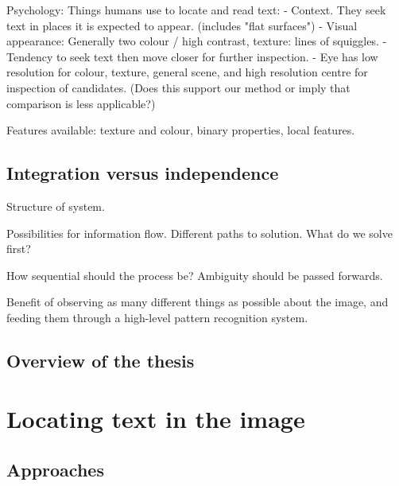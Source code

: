 Psychology:  Things humans use to locate and read text:
	- Context.  They seek text in places it is expected to appear.  (includes "flat surfaces")
	- Visual appearance:  Generally two colour / high contrast, texture: lines of squiggles.
	- Tendency to seek text then move closer for further inspection.
	- Eye has low resolution for colour, texture, general scene, and high resolution centre for inspection of candidates.  (Does this support our method or imply that comparison is less applicable?)

Features available: texture and colour, binary properties, local features.



\section{Integration versus independence} %


Structure of system.

Possibilities for information flow.  Different paths to solution.  What do we solve first?

How sequential should the process be?  Ambiguity should be passed forwards.

Benefit of observing as many different things as possible about the image, and feeding them through a high-level pattern recognition system.



\section{Overview of the thesis} %




\chapter{Locating text in the image}


\section{Approaches} %

